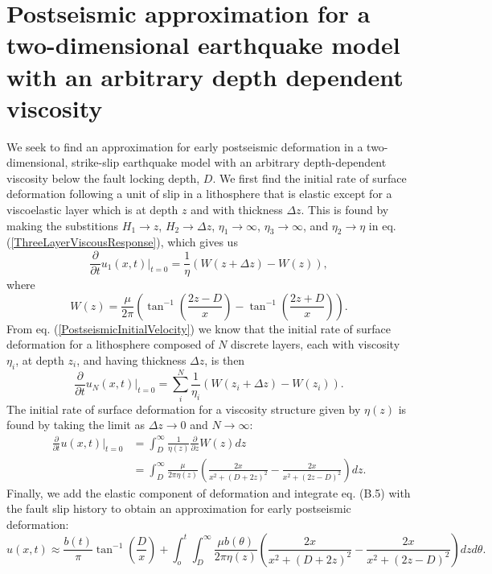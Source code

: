 \documentclass[extra,mreferee]{gji}
\begin{document}
\section{Postseismic approximation for a two-dimensional earthquake model with an arbitrary depth dependent viscosity}
We seek to find an approximation for early postseismic deformation in
a two-dimensional, strike-slip earthquake model with an arbitrary
depth-dependent viscosity below the fault locking depth, $D$.  We
first find the initial rate of surface deformation following a unit of
slip in a lithosphere that is elastic except for a viscoelastic layer
which is at depth $z$ and with thickness $\Delta z$. This is found by
making the substitions $H_1 \to z$, $H_2 \to \Delta z$, $\eta_1 \to
\infty$, $\eta_3 \to \infty$, and $\eta_2 \to \eta$ in
eq. (\ref{ThreeLayerViscousResponse}), which gives us
\begin{equation}
  \frac{\partial}{\partial t}u_1(x,t)\big|_{t=0} = 
  \frac{1}{\eta}(W(z+\Delta z) - W(z)),
\end{equation}
where
\begin{equation}
  W(z) = \frac{\mu}{2\pi}\left(\tan^{-1}\left(\frac{2z-D}{x}\right) -
  \tan^{-1}\left(\frac{2z+D}{x}\right)\right).
\end{equation}
From eq. (\ref{PostseismicInitialVelocity}) we know that the initial
rate of surface deformation for a lithosphere composed of $N$ discrete
layers, each with viscosity $\eta_i$, at depth $z_i$, and having
thickness $\Delta z$, is then
\begin{equation}
  \frac{\partial}{\partial t}u_N(x,t)\big|_{t=0} = \sum_i^N
  \frac{1}{\eta_i}(W(z_i + \Delta z) - W(z_i)).
\end{equation}
The initial rate of surface deformation for a viscosity structure
given by $\eta(z)$ is found by taking the limit as $\Delta z \to 0$
and $N \to \infty$:
\begin{align}\label{ArbitraryViscousResponse}
 \frac{\partial}{\partial t}u(x,t)\big|_{t=0} &= \int_D^\infty
 \frac{1}{\eta(z)}\frac{\partial}{\partial z} W(z) dz\\
 &= \int_D^{\infty}\frac{\mu}{2\pi\eta(z)}\left(\frac{2x}{x^2 + \left(D + 2z\right)^2} -
                     \frac{2x}{x^2 + \left(2z - D\right)^2}\right) dz.
\end{align}
Finally, we add the elastic component of deformation and integrate
eq. (B.5) with the fault slip history to obtain
an approximation for early postseismic deformation:
\begin{equation}
u(x,t) \approx \frac{b(t)}{\pi}\tan^{-1}(\frac{D}{x}) + 
               \int_o^t\int_D^\infty \frac{\mu b(\theta)}{2\pi\eta(z)}
                                    \left(\frac{2x}{x^2 + \left(D + 2z\right)^2} - 
                                    \frac{2x}{x^2 + \left(2z - D\right)^2}\right)
                                    dz d\theta.
\end{equation}
\end{document}
